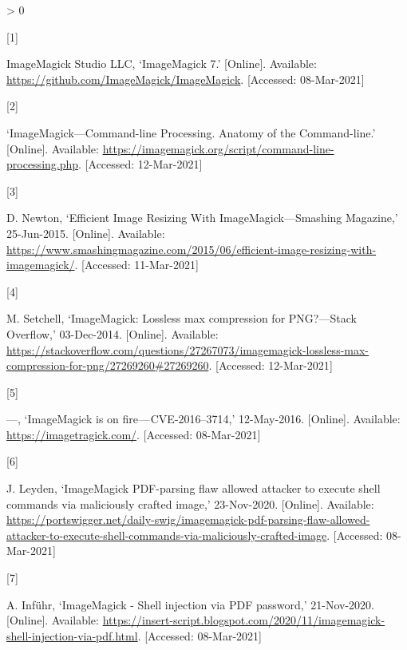 \documentclass[
  11pt,
  british,
  a4paper,
]{article}
\newlength{\cslhangindent}
\newlength{\csllabelwidth}
\newenvironment{CSLReferences}[2] %
 {%
  \setlength{\parindent}{0pt}
  \ifodd #1 \everypar{\setlength{\hangindent}{\cslhangindent}}\ignorespaces\fi
  \ifnum #2 > 0
  \setlength{\parskip}{#2\baselineskip}
  \fi
 }%
 {}
\newcommand{\CSLLeftMargin}[1]{\parbox[t]{\csllabelwidth}{#1}}
\newcommand{\CSLRightInline}[1]{\parbox[t]{\linewidth - \csllabelwidth}{#1}\break}
\begin{document}
\hypertarget{refs}{}
\begin{CSLReferences}{0}{0}
\leavevmode\hypertarget{ref-imagemagicksource}{}%
\CSLLeftMargin{{[}1{]} }
\CSLRightInline{ImageMagick Studio LLC, {`ImageMagick 7.'} {[}Online{]}.
Available: \url{https://github.com/ImageMagick/ImageMagick}.
{[}Accessed: 08-Mar-2021{]}}

\leavevmode\hypertarget{ref-imcli}{}%
\CSLLeftMargin{{[}2{]} }
\CSLRightInline{{`{ImageMagick---Command-line Processing}. {Anatomy of
the Command-line}.'} {[}Online{]}. Available:
\url{https://imagemagick.org/script/command-line-processing.php}.
{[}Accessed: 12-Mar-2021{]}}

\leavevmode\hypertarget{ref-newton2015}{}%
\CSLLeftMargin{{[}3{]} }
\CSLRightInline{D. Newton, {`{Efficient Image Resizing With
ImageMagick---Smashing Magazine},'} 25-Jun-2015. {[}Online{]}.
Available:
\url{https://www.smashingmagazine.com/2015/06/efficient-image-resizing-with-imagemagick/}.
{[}Accessed: 11-Mar-2021{]}}

\leavevmode\hypertarget{ref-setchell2014}{}%
\CSLLeftMargin{{[}4{]} }
\CSLRightInline{M. Setchell, {`{ImageMagick: Lossless max compression
for PNG?---Stack Overflow},'} 03-Dec-2014. {[}Online{]}. Available:
\url{https://stackoverflow.com/questions/27267073/imagemagick-lossless-max-compression-for-png/27269260\#27269260}.
{[}Accessed: 12-Mar-2021{]}}

\leavevmode\hypertarget{ref-imagetragick2016}{}%
\CSLLeftMargin{{[}5{]} }
\CSLRightInline{---, {`ImageMagick is on fire --- CVE-2016--3714,'}
12-May-2016. {[}Online{]}. Available: \url{https://imagetragick.com/}.
{[}Accessed: 08-Mar-2021{]}}

\leavevmode\hypertarget{ref-leyden2020}{}%
\CSLLeftMargin{{[}6{]} }
\CSLRightInline{J. Leyden, {`ImageMagick PDF-parsing flaw allowed
attacker to execute shell commands via maliciously crafted image,'}
23-Nov-2020. {[}Online{]}. Available:
\url{https://portswigger.net/daily-swig/imagemagick-pdf-parsing-flaw-allowed-attacker-to-execute-shell-commands-via-maliciously-crafted-image}.
{[}Accessed: 08-Mar-2021{]}}

\leavevmode\hypertarget{ref-infuhr2020}{}%
\CSLLeftMargin{{[}7{]} }
\CSLRightInline{A. Inführ, {`{ImageMagick - Shell injection via PDF
password},'} 21-Nov-2020. {[}Online{]}. Available:
\url{https://insert-script.blogspot.com/2020/11/imagemagick-shell-injection-via-pdf.html}.
{[}Accessed: 08-Mar-2021{]}}

\end{CSLReferences}
\end{document}
